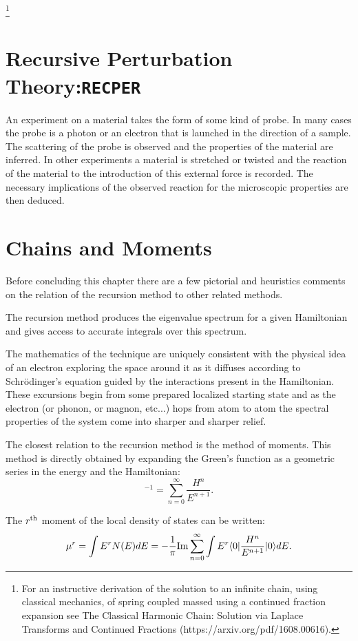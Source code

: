 \footnote{For an instructive derivation of the solution to an infinite 
chain, using classical mechanics, of spring coupled massed using a continued fraction expansion see 
The Classical Harmonic Chain: Solution via Laplace Transforms and Continued Fractions 
(https://arxiv.org/pdf/1608.00616).}

\section{Recursive Perturbation Theory:\texttt{RECPER}}
An experiment on a material takes the form of some kind of probe. In many cases the probe is
a photon or an electron that is launched in the direction of a sample. The scattering 
of the probe is observed and the properties of the material are inferred.
In other experiments a material is stretched or twisted and the 
reaction of the material to the introduction of this external
force is recorded. The necessary implications of the observed reaction
for the microscopic properties are then deduced.

\section{Chains and Moments}
Before concluding this chapter there are a few 
pictorial and heuristics comments on the relation of 
the recursion method to other related methods.

The recursion method produces the eigenvalue spectrum
for a given Hamiltonian and gives access to accurate
integrals over this spectrum. 

The mathematics of the technique are uniquely consistent
with the physical idea of an electron exploring
the space around it as it diffuses according to Schr\"odinger's
equation guided by the interactions present in the Hamiltonian.
These excursions begin from some prepared localized starting state
and as the electron (or phonon, or magnon, etc...) hops from atom to atom
the spectral properties of the system come into sharper and sharper relief.

The closest relation to the recursion method is the method of moments.
This method is directly obtained by expanding the 
Green's function as a geometric series in the energy and the Hamiltonian:
%
\begin{equation}
[E-H]^{-1} = \sum_{n=0}^{\infty} \frac{H^{n}}{E^{n+1}}.
\end{equation}
%

The $r^{\rm th}$ moment of the local density of states can be written:
%
\begin{equation}
\mu^{r} = \int E^{r}N(E)dE = -\frac{1}{\pi}{\rm Im}\sum_{n=0}^{\infty}\int E^{r}\langle 0|\frac{H^{n}}{E^{n+1}}|0\rangle dE.
\end{equation}
%

